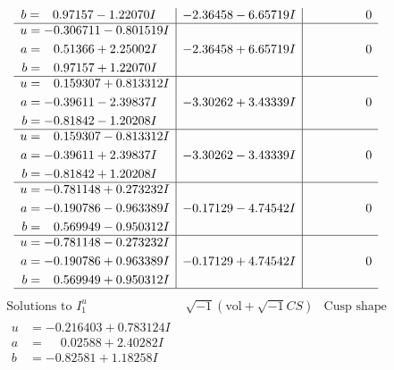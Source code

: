 \documentclass[1p]{elsarticle_modified}
\theoremstyle{definition}
\newcommand{\I}{\sqrt{-1}}
\begin{document}
$$\begin{array}{c|c|c}
\begin{aligned}
b &= \phantom{-}0.97157 - 1.22070 I\end{aligned}
 & -2.36458 - 6.65719 I & \phantom{-0.000000 } 0 \\ \hline\begin{aligned}
u &= -0.306711 - 0.801519 I \\
a &= \phantom{-}0.51366 + 2.25002 I \\
b &= \phantom{-}0.97157 + 1.22070 I\end{aligned}
 & -2.36458 + 6.65719 I & \phantom{-0.000000 } 0 \\ \hline\begin{aligned}
u &= \phantom{-}0.159307 + 0.813312 I \\
a &= -0.39611 - 2.39837 I \\
b &= -0.81842 - 1.20208 I\end{aligned}
 & -3.30262 + 3.43339 I & \phantom{-0.000000 } 0 \\ \hline\begin{aligned}
u &= \phantom{-}0.159307 - 0.813312 I \\
a &= -0.39611 + 2.39837 I \\
b &= -0.81842 + 1.20208 I\end{aligned}
 & -3.30262 - 3.43339 I & \phantom{-0.000000 } 0 \\ \hline\begin{aligned}
u &= -0.781148 + 0.273232 I \\
a &= -0.190786 - 0.963389 I \\
b &= \phantom{-}0.569949 - 0.950312 I\end{aligned}
 & -0.17129 - 4.74542 I & \phantom{-0.000000 } 0 \\ \hline\begin{aligned}
u &= -0.781148 - 0.273232 I \\
a &= -0.190786 + 0.963389 I \\
b &= \phantom{-}0.569949 + 0.950312 I\end{aligned}
 & -0.17129 + 4.74542 I & \phantom{-0.000000 } 0\\
 \hline 
 \end{array}$$\newpage$$\begin{array}{c|c|c}  
\text{Solutions to }I^u_{1}& \I (\text{vol} + \sqrt{-1}CS) & \text{Cusp shape}\\
 \hline 
\begin{aligned}
u &= -0.216403 + 0.783124 I \\
a &= \phantom{-}0.02588 + 2.40282 I \\
b &= -0.82581 + 1.18258 I\end{aligned}

\end{array}$$
\end{document}
